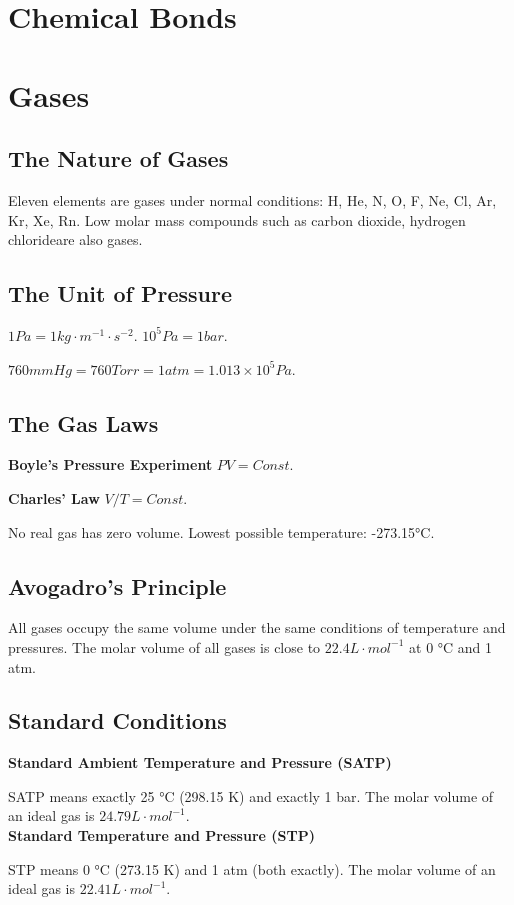 \documentclass[a4paper,12pt]{article}
\begin{document}
\newpage
\section{Chemical Bonds}

\newpage
\section{Gases}
\subsection{The Nature of Gases} Eleven elements are gases under normal conditions: H, He, N, O, F, Ne, Cl, Ar, Kr, Xe, Rn. Low molar mass compounds such as carbon dioxide, hydrogen chlorideare also gases.
\subsection{The Unit of Pressure}
$1 Pa=1 kg\cdot m^{-1}\cdot s^{-2}$. $10^{5} Pa=1 bar$.\par $760 mmHg=760 Torr=1atm=1.013\times 10^{5} Pa$.
\subsection{The Gas Laws}
\textbf{Boyle's Pressure Experiment} $PV=Const.$\par
\textbf{Charles' Law} $V/T=Const.$\par No real gas has zero volume. Lowest possible temperature: -273.15°C.
\subsection{Avogadro's Principle}
All gases occupy the same volume under the same conditions of temperature
and pressures. The molar volume of all gases is close to $22.4 L\cdot mol^{-1}$ at 0 °C and 1 atm.
\subsection{Standard Conditions}
\noindent\textbf{Standard Ambient Temperature and Pressure (SATP)}\par SATP means exactly 25 °C (298.15 K) and exactly 1 bar. The molar volume of an ideal gas is $24.79 L\cdot mol^{-1}$.\\
\noindent\textbf{Standard Temperature and Pressure (STP)}\par STP means 0 °C (273.15 K) and 1 atm (both exactly).
The molar volume of an ideal gas is $22.41 L\cdot mol^{-1}$.
\end{document}
